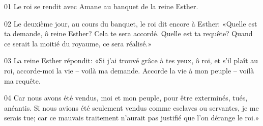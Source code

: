 01 Le roi se rendit avec Amane au banquet de la reine Esther.

02 Le deuxième jour, au cours du banquet, le roi dit encore à Esther: «Quelle est ta demande, ô reine Esther? Cela te sera accordé. Quelle est ta requête? Quand ce serait la moitié du royaume, ce sera réalisé.»

03 La reine Esther répondit: «Si j’ai trouvé grâce à tes yeux, ô roi, et s’il plaît au roi, accorde-moi la vie – voilà ma demande. Accorde la vie à mon peuple – voilà ma requête.

04 Car nous avons été vendus, moi et mon peuple, pour être exterminés, tués, anéantis. Si nous avions été seulement vendus comme esclaves ou servantes, je me serais tue; car ce mauvais traitement n’aurait pas justifié que l’on dérange le roi.»
